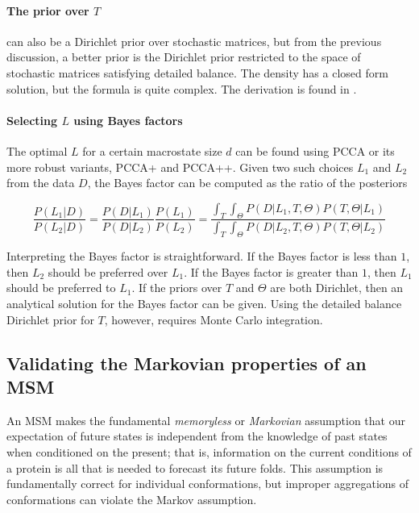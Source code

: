 \documentclass{article}
\begin{document}
\paragraph{The prior over $T$} can also be a Dirichlet prior over stochastic matrices, but from the previous discussion, a better prior is the Dirichlet prior restricted to the space of stochastic matrices satisfying detailed balance. The density has a closed form solution, but the formula is quite complex. The derivation is found in \cite{diaconis}.

\paragraph{Selecting $L$ using Bayes factors} The optimal $L$ for a certain macrostate size $d$ can be found using PCCA or its more robust variants, PCCA+ and PCCA++. Given two such choices $L_1$ and $L_2$ from the data $D$, the Bayes factor can be computed as the ratio of the posteriors

$$\dfrac{P(L_1 | D)}{P(L_2|D)} = \dfrac{P(D|L_1)}{P(D|L_2)}\dfrac{P(L_1)}{P(L_2)} 
= \dfrac{\int_T \int_\Theta P(D|L_1, T, \Theta)P(T, \Theta | L_1)}
{\int_T \int_\Theta P(D|L_2,T,\Theta)P(T, \Theta | L_2)}$$

Interpreting the Bayes factor is straightforward. If the Bayes factor is less than $1$, then $L_2$ should be preferred over $L_1$. If the Bayes factor is greater than $1$, then $L_1$ should be preferred to $L_1$. If the priors over $T$ and $\Theta$ are both Dirichlet, then an analytical solution for the Bayes factor can be given. Using the detailed balance Dirichlet prior for $T$, however, requires Monte Carlo integration.

\subsection{Validating the Markovian properties of an MSM}
An MSM makes the fundamental \textit{memoryless} or \textit{Markovian} assumption that our expectation of future states is independent from the knowledge of past states when conditioned on the present; that is, information on the current conditions of a protein is all that is needed to forecast its future folds. This assumption is fundamentally correct for individual conformations, but improper aggregations of conformations can violate the Markov assumption.
\end{document}
